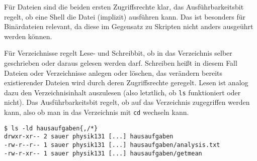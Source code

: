 F\"ur Dateien sind die beiden ersten Zugriffsrechte klar, das
Ausf\"uhrbarkeitsbit regelt, ob eine Shell die Datei (implizit) ausf\"uhren
kann. Das ist besonders f\"ur Bin\"ardateien relevant, da diese im Gegensatz zu
Skripten nicht anders ausge\"uhrt werden k\"onnen.

F\"ur Verzeichnisse regelt Lese- und Schreibbit, ob in das Verzeichnis selber
geschrieben oder daraus gelesen werden darf. Schreiben hei\ss{}t in diesem Fall
Dateien oder Verzeichnisse anlegen oder l\"oschen, das ver\"andern bereits
existierender Dateien wird durch deren Zugriffsrechte geregelt. Lesen ist analog
dazu den Verzeichnisinhalt auszulesen (also letztlich, ob \lstinline'ls'
funktioniert oder nicht). Das Ausf\"uhrbarkeitsbit regelt, ob auf das
Verzeichnis zugegriffen werden kann, also ob man in das Verzeichnis mit
\lstinline'cd' wechseln kann. %

\begin{lstlisting}[style=Bash]
$ ls -ld hausaufgaben{,/*}
drwxr-xr-- 2 sauer physik131 [...] hausaufgaben
-rw-r--r-- 1 sauer physik131 [...] hausaufgaben/analysis.txt
-rw-r-xr-- 1 sauer physik131 [...] hausaufgaben/getmean
\end{lstlisting}

